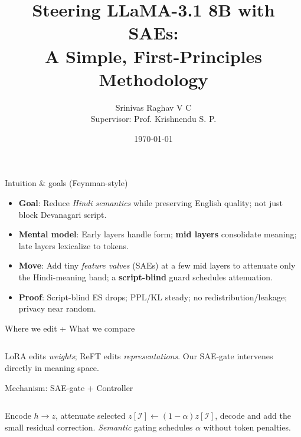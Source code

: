 \documentclass[aspectratio=169]{beamer}
\title{Steering LLaMA-3.1 8B with SAEs:\\ A Simple, First-Principles Methodology}
\author{Srinivas Raghav V C\\ Supervisor: Prof. Krishnendu S. P.}
\date{\today}
\newcommand{\diagrampath}{../diagrams}
\begin{document}
\maketitle

\begin{frame}{Intuition & goals (Feynman-style)}
\small
\begin{itemize}
  \item \textbf{Goal}: Reduce \emph{Hindi semantics} while preserving English quality; not just block Devanagari script.
  \item \textbf{Mental model}: Early layers handle form; \textbf{mid layers} consolidate meaning; late layers lexicalize to tokens.
  \item \textbf{Move}: Add tiny \emph{feature valves} (SAEs) at a few mid layers to attenuate only the Hindi-meaning band; a \textbf{script-blind} guard schedules attenuation.
  \item \textbf{Proof}: Script-blind ES drops; PPL/KL steady; no redistribution/leakage; privacy near random.
\end{itemize}
\end{frame}

\begin{frame}{Where we edit + What we compare}
\begin{columns}[T,onlytextwidth]
\centering 
{}
\centering 
\end{columns}
\vspace{1mm}
\small LoRA edits \emph{weights}; ReFT edits \emph{representations}. Our SAE-gate intervenes directly in meaning space.
\end{frame}

\begin{frame}{Mechanism: SAE-gate + Controller}
\begin{columns}[T,onlytextwidth]
\centering 
{}
\centering 
\end{columns}
\vspace{1mm}
\small Encode $h\to z$, attenuate selected $z[\mathcal{I}]\leftarrow (1-\alpha)z[\mathcal{I}]$, decode and add the small residual correction. \emph{Semantic} gating schedules $\alpha$ without token penalties.
\end{frame}
\end{document}
